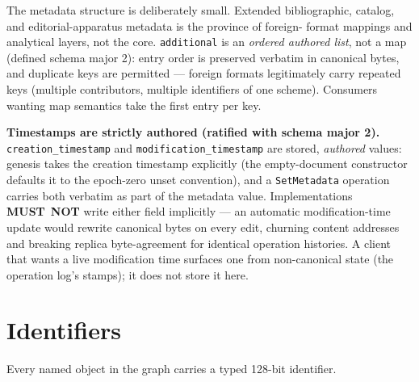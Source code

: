 \documentclass[11pt,letterpaper]{report}
\newcounter{requirement}[chapter]
\newcommand{\MUSTNOT}{\textbf{MUST}\nobreak\ \textbf{NOT}}
\begin{document}
The metadata structure is deliberately small. Extended bibliographic,
catalog, and editorial-apparatus metadata is the province of foreign-
format mappings and analytical layers, not the core.
\texttt{additional} is an \emph{ordered authored list}, not a map
(defined schema major 2): entry order is preserved verbatim in
canonical bytes, and duplicate keys are permitted --- foreign formats
legitimately carry repeated keys (multiple contributors, multiple
identifiers of one scheme). Consumers wanting map semantics take the
first entry per key.

\begin{requirement}
  \label{req:graph:metadata-timestamps}
  \textbf{Timestamps are strictly authored (ratified with schema
  major 2).} \texttt{creation\_timestamp} and
  \texttt{modification\_timestamp} are stored, \emph{authored} values:
  genesis takes the creation timestamp explicitly (the empty-document
  constructor defaults it to the epoch-zero unset convention), and a
  \texttt{SetMetadata} operation carries both verbatim as part of the
  metadata value. Implementations \MUSTNOT{} write either field
  implicitly --- an automatic modification-time update would rewrite
  canonical bytes on every edit, churning content addresses and breaking
  replica byte-agreement for identical operation histories. A client
  that wants a live modification time surfaces one from non-canonical
  state (the operation log's stamps); it does not store it here.
\end{requirement}

\section{Identifiers}
\label{sec:graph:ids}

Every named object in the graph carries a typed 128-bit identifier.
\end{document}
